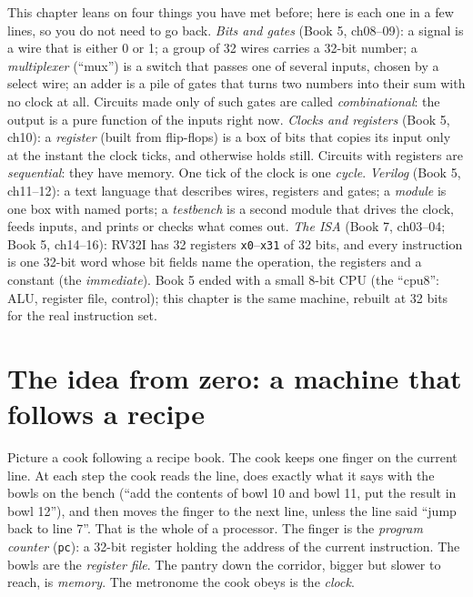 \begin{rulebox}
This chapter leans on four things you have met before; here is each
one in a few lines, so you do not need to go back.
\emph{Bits and gates} (Book 5, ch08--09): a signal is a wire that is
either 0 or 1; a group of 32 wires carries a 32-bit number; a
\emph{multiplexer} (``mux'') is a switch that passes one of several
inputs, chosen by a select wire; an adder is a pile of gates that
turns two numbers into their sum with no clock at all. Circuits made
only of such gates are called \emph{combinational}: the output is a
pure function of the inputs right now.
\emph{Clocks and registers} (Book 5, ch10): a \emph{register} (built
from flip-flops) is a box of bits that copies its input only at the
instant the clock ticks, and otherwise holds still. Circuits with
registers are \emph{sequential}: they have memory. One tick of the
clock is one \emph{cycle}.
\emph{Verilog} (Book 5, ch11--12): a text language that describes
wires, registers and gates; a \emph{module} is one box with named
ports; a \emph{testbench} is a second module that drives the clock,
feeds inputs, and prints or checks what comes out.
\emph{The ISA} (Book 7, ch03--04; Book 5, ch14--16): RV32I has 32
registers \texttt{x0}--\texttt{x31} of 32 bits, and every instruction
is one 32-bit word whose bit fields name the operation, the registers
and a constant (the \emph{immediate}). Book 5 ended with a small
8-bit CPU (the ``cpu8'': ALU, register file, control); this chapter is
the same machine, rebuilt at 32 bits for the real instruction set.
\end{rulebox}

\section{The idea from zero: a machine that follows a recipe}
\label{sec:zero05}

Picture a cook following a recipe book. The cook keeps one finger on
the current line. At each step the cook reads the line, does exactly
what it says with the bowls on the bench (``add the contents of bowl
10 and bowl 11, put the result in bowl 12''), and then moves the
finger to the next line, unless the line said ``jump back to line
7''. That is the whole of a processor. The finger is the \emph{program
counter} (\texttt{pc}): a 32-bit register holding the address of the
current instruction. The bowls are the \emph{register file}. The
pantry down the corridor, bigger but slower to reach, is
\emph{memory}. The metronome the cook obeys is the \emph{clock}.

